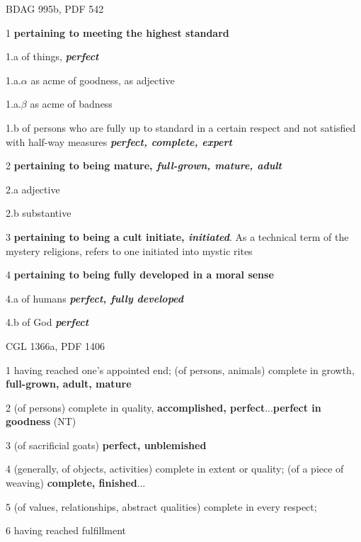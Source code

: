 				\begin{compactdesc}
					\item[BDAG 995b, PDF 542] \textbf{}
						\begin{compactitem}
							\item[1] \textbf{pertaining to meeting the highest standard}
							\item[1.a] of things, \textbf{\textit{perfect}}
							\item[1.a.$\alpha$] as acme of goodness, as adjective
							\item[1.a.$\beta$] as acme of badness
							\item[1.b] of persons who are fully up to standard in a certain respect and not satisfied with half-way measures \textbf{\textit{perfect, complete, expert}}
							\item[2] \textbf{pertaining to being mature, \textit{full-grown, mature, adult}}
							\item[2.a] adjective
							\item[2.b] substantive
							\item[3] \textbf{pertaining to being a cult initiate, \textit{initiated}}. As a technical term of the mystery religions,  refers to one initiated into mystic rites
							\item[4] \textbf{pertaining to being fully developed in a moral sense}
							\item[4.a] of humans \textbf{\textit{perfect, fully developed}}
							\item[4.b] of God \textbf{\textit{perfect}}
						\end{compactitem}
					\item[CGL 1366a, PDF 1406] \textbf{}
						\begin{compactitem}
							\item[1] having reached one's appointed end; (of persons, animals) complete in growth, \textbf{full-grown, adult, mature}
							\item[2] (of persons) complete in quality, \textbf{accomplished, perfect}...\textbf{perfect in goodness} (NT)
							\item[3] (of sacrificial goats) \textbf{perfect, unblemished}
							\item[4] (generally, of objects, activities) complete in extent or quality; (of a piece of weaving) \textbf{complete, finished}...
							\item[5] (of values, relationships, abstract qualities) complete in every respect;
							\item[6] having reached fulfillment

\end{compactitem}
\end{compactdesc}
